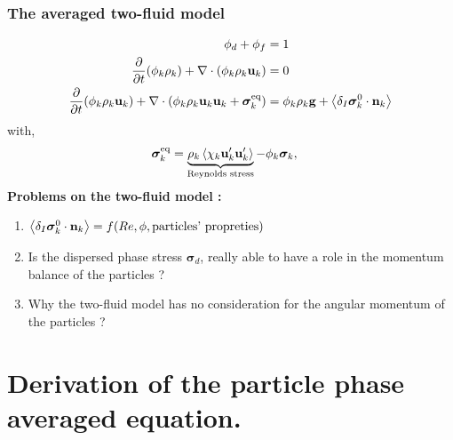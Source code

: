 \documentclass{sintefbeamer}
\begin{document}
\begin{frame}
  \frametitle{The averaged two-fluid model }
\begin{align*}
  \phi_d + \phi_f &= 1\\
  \frac{\partial}{\partial t} (\phi_k \rho_k)  
  + \mathbf{\nabla}\cdot (\phi_k \rho_k\textbf{u}_k)
  &= 
  0\\
  \frac{\partial}{\partial t} (\phi_k \rho_k\textbf{u}_k)  
  + \mathbf{\nabla}\cdot (
      \phi_k \rho_k\textbf{u}_k\textbf{u}_k
      + \bm{\sigma}_k^\text{eq}
  )
  &= 
  \phi_k  \rho_k \textbf{g}
  +  \left<\delta_I \bm{\sigma}_k^0 \cdot \textbf{n}_k\right>
\end{align*}
with, 
\begin{align*}
  &\bm{\sigma}_k^\text{eq}
  = 
   \underbrace{\rho_k\avg{\chi_k \textbf{u}_k'\textbf{u}_k'}}_\text{Reynolds stress}
    - \phi_k \bm{\sigma}_k,%
\end{align*}
\textbf{Problems on the two-fluid model : }
\begin{enumerate}
  \item $\left<\delta_I \bm{\sigma}_k^0 \cdot \textbf{n}_k\right> =f(Re,\phi,\text{particles' propreties})$
  \item Is the dispersed phase stress $\bm\sigma_d$, really able to have a role in the momentum balance of the particles ? 
  \item  Why the two-fluid model has no consideration for the angular momentum of the particles ? 
\end{enumerate}

\end{frame}


\section{Derivation of the particle phase averaged equation.}
\section*{}
\end{document}
